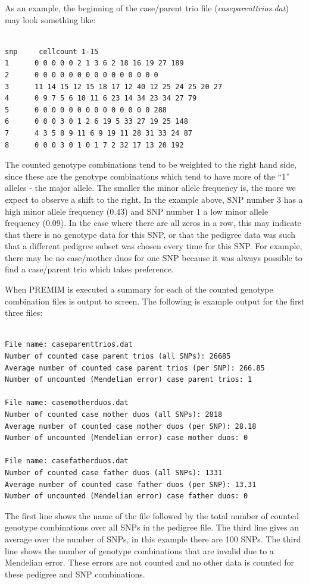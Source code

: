 \documentclass[a4paper,12pt]{article}
\begin{document}
As an example, the beginning of the case/parent trio file ({\it caseparenttrios.dat}) may look something like: 
\vspace{0.35cm} \begin{lstlisting}

snp     cellcount 1-15
1      0 0 0 0 0 2 1 3 6 2 18 16 19 27 189
2      0 0 0 0 0 0 0 0 0 0 0 0 0 0 0
3      11 14 15 12 15 18 17 12 40 12 25 24 25 20 27
4      0 9 7 5 6 10 11 6 23 14 34 23 34 27 79
5      0 0 0 0 0 0 0 0 0 0 0 0 0 0 288
6      0 0 0 3 0 1 2 6 19 5 33 27 19 25 148
7      4 3 5 8 9 11 6 9 19 11 28 31 33 24 87
8      0 0 0 3 0 1 0 1 7 2 32 17 13 20 192

\end{lstlisting} \vspace{0.35cm}
The counted genotype combinations tend to be weighted to the right hand side, since these are the genotype combinations which tend to have more of the ``1'' alleles - the major allele. The smaller the minor allele frequency is, the more we expect to observe a shift to the right. In the example above, SNP number 3 has a high minor allele frequency (0.43) and SNP number 1 a low minor allele frequency (0.09). In the case where there are all zeros in a row, this may indicate that there is no genotype data for this SNP, or that the pedigree data was such that a different pedigree subset was chosen every time for this SNP. For example, there may be no case/mother duos for one SNP because it was always possible to find a case/parent trio which takes preference. 

When PREMIM is executed a summary for each of the counted genotype combination files is output to screen. The following is example output for the first three files: 
\vspace{0.35cm} \begin{lstlisting}

File name: caseparenttrios.dat
Number of counted case parent trios (all SNPs): 26685
Average number of counted case parent trios (per SNP): 266.85
Number of uncounted (Mendelian error) case parent trios: 1

File name: casemotherduos.dat
Number of counted case mother duos (all SNPs): 2818
Average number of counted case mother duos (per SNP): 28.18
Number of uncounted (Mendelian error) case mother duos: 0

File name: casefatherduos.dat
Number of counted case father duos (all SNPs): 1331
Average number of counted case father duos (per SNP): 13.31
Number of uncounted (Mendelian error) case father duos: 0

\end{lstlisting} \vspace{0.35cm}
The first line shows the name of the file followed by the total number of counted genotype combinations over all SNPs in the pedigree file. The third line gives an average over the number of SNPs, in this example there are 100 SNPs. The third line shows the number of genotype combinations that are invalid due to a Mendelian error. These errors are not counted and no other data is counted for these pedigree and SNP combinations. 
\end{document}

